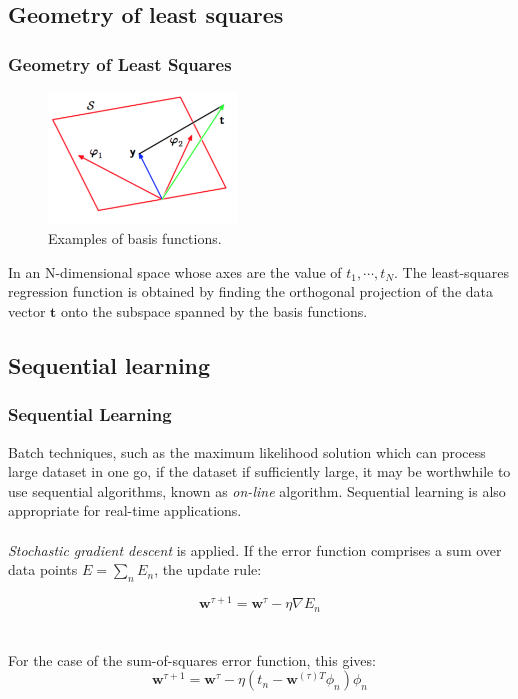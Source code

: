 \documentclass{beamer}
\begin{document}
\subsection{Geometry of least squares}


\begin{frame}
\frametitle{Geometry of Least Squares}
\begin{figure}
\includegraphics[width=5cm]{Figure2}
\caption{Examples of basis functions.}
\label{Figure2}
\end{figure}

In an N-dimensional space whose axes are the value of $t_1,\cdots,t_N$. The least-squares regression function is obtained by finding the orthogonal projection of the data vector $\bm{t}$ onto the subspace spanned by the basis functions.

\end{frame}


\subsection{Sequential learning} 


\begin{frame}
\frametitle{Sequential Learning}
Batch techniques, such as the maximum likelihood solution which can process large dataset in one go, if the dataset if sufficiently large, it may be worthwhile to use sequential algorithms, known as \textit{on-line} algorithm. Sequential learning is also appropriate for real-time applications.\\~\\

\textit{Stochastic gradient descent} is applied. If the error function  comprises a sum over data points $E = \sum_n E_n$, the update rule:

\begin{equation}
\bm{w}^{\tau+1}=\bm{w}^{\tau}-\eta \nabla E_n
\end{equation}\\~\\

For the case of  the sum-of-squares error function, this gives:
\begin{equation}
\bm{w}^{\tau+1}=\bm{w}^{\tau}-\eta (t_n - \bm{w}^{(\tau)T}\phi_n)\phi_n
\end{equation}

\end{frame}
\end{document}
